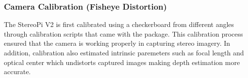 

\subsubsection{Camera Calibration (Fisheye Distortion)}
The StereoPi V2 is first calibrated using a checkerboard from different angles through calibration scripts that came with the package. This calibration process ensured that the camera is working properly in capturing stereo imagery. In addition, calibration also estimated intrinsic paremeters such as focal length and optical center which undistorts captured images making depth estimation more accurate.

